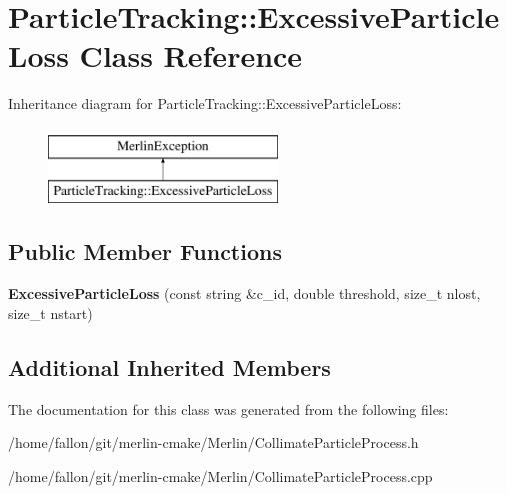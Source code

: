 \hypertarget{classParticleTracking_1_1ExcessiveParticleLoss}{}\section{Particle\+Tracking\+:\+:Excessive\+Particle\+Loss Class Reference}
\label{classParticleTracking_1_1ExcessiveParticleLoss}
Inheritance diagram for Particle\+Tracking\+:\+:Excessive\+Particle\+Loss\+:\begin{figure}[H]
\begin{center}
\leavevmode
\includegraphics[height=2.000000cm]{classParticleTracking_1_1ExcessiveParticleLoss}
\end{center}
\end{figure}
\subsection*{Public Member Functions}
\begin{DoxyCompactItemize}
\item 
\mbox{\label{classParticleTracking_1_1ExcessiveParticleLoss_a236082baeff01fd4a73dd7af3b2a995c}} 
{\bfseries Excessive\+Particle\+Loss} (const string \&c\+\_\+id, double threshold, size\+\_\+t nlost, size\+\_\+t nstart)
\end{DoxyCompactItemize}
\subsection*{Additional Inherited Members}


The documentation for this class was generated from the following files\+:\begin{DoxyCompactItemize}
\item 
/home/fallon/git/merlin-\/cmake/\+Merlin/Collimate\+Particle\+Process.\+h\item 
/home/fallon/git/merlin-\/cmake/\+Merlin/Collimate\+Particle\+Process.\+cpp\end{DoxyCompactItemize}

